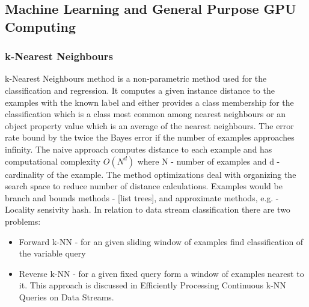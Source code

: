 \documentclass[]{report}
\begin{document}
\subsection*{Machine Learning and General Purpose GPU Computing}
\subsubsection*{k-Nearest Neighbours}

k-Nearest Neighbours method is a non-parametric method used for the classification and regression. It computes a given instance distance to the examples with the known label and either provides a class membership for the classification which is a class most common among nearest neighbours or an object property value which is an average of the nearest neighbours. The error rate bound by the twice the Bayes error if the number of examples approaches infinity\cite{Cover:2006:NNP:2263261.2267456}.
The naive approach computes distance to each example and has computational complexity  $ O(N^{d}) $ where N - number of examples and d - cardinality of the example. \cite{something}
The method optimizations deal with organizing the search space to reduce number of distance calculations. Examples would be branch and bounds \cite{something} methods - [list trees],  and  approximate methods, e.g.  - Locality sensivity hash.\cite{something}
In relation to data stream classification there are two problems:
\begin{itemize}
\item Forward k-NN - for an given sliding window of examples find classification of the variable query
\item Reverse k-NN - for a given fixed query form a window of examples nearest to it. This approach is discussed in Efficiently Processing Continuous k-NN Queries on Data Streams\cite{BohmBeng}.
\end{itemize}
\end{document}
